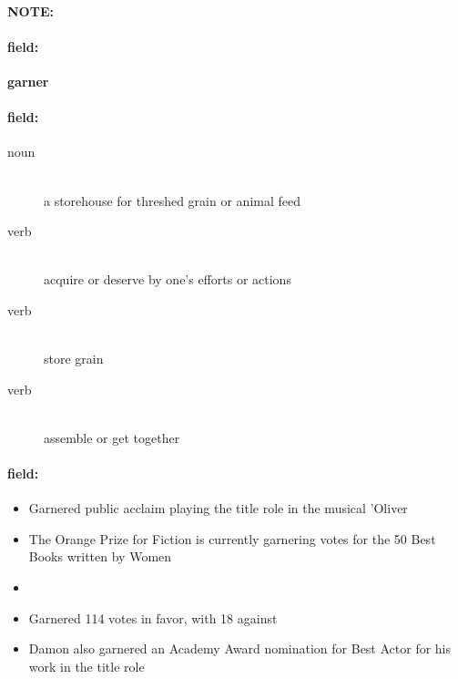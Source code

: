 \documentclass[12pt]{article}
\newenvironment{note}{\paragraph{NOTE:}}{}
\newenvironment{field}{\paragraph{field:}}{}
\begin{document}
\begin{note}
\begin{field}
\textbf{\large garner}
\end{field}


\begin{field}
\begin{description}
\item[noun] \hfill \\ 
a storehouse for threshed grain or animal feed

\item[verb] \hfill \\ 
acquire or deserve by one's efforts or actions

\item[verb] \hfill \\ 
store grain

\item[verb] \hfill \\ 
assemble or get together

\end{description}
\end{field}

\begin{field}
\begin{itemize}
\item Garnered public acclaim playing the title role in the musical 'Oliver
\item The Orange Prize for Fiction is currently garnering votes for the 50 Best Books written by Women
\item 
\item Garnered 114 votes in favor, with 18 against
\item Damon also garnered an Academy Award nomination for Best Actor for his work in the title role
\end{itemize}
\end{field}
\end{note}
\end{document}
